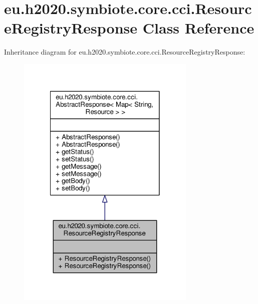 \hypertarget{classeu_1_1h2020_1_1symbiote_1_1core_1_1cci_1_1ResourceRegistryResponse}{}\section{eu.\+h2020.\+symbiote.\+core.\+cci.\+Resource\+Registry\+Response Class Reference}
\label{classeu_1_1h2020_1_1symbiote_1_1core_1_1cci_1_1ResourceRegistryResponse}


Inheritance diagram for eu.\+h2020.\+symbiote.\+core.\+cci.\+Resource\+Registry\+Response\+:\nopagebreak
\begin{figure}[H]
\begin{center}
\leavevmode
\includegraphics[width=242pt]{classeu_1_1h2020_1_1symbiote_1_1core_1_1cci_1_1ResourceRegistryResponse__inherit__graph}
\end{center}
\end{figure}


